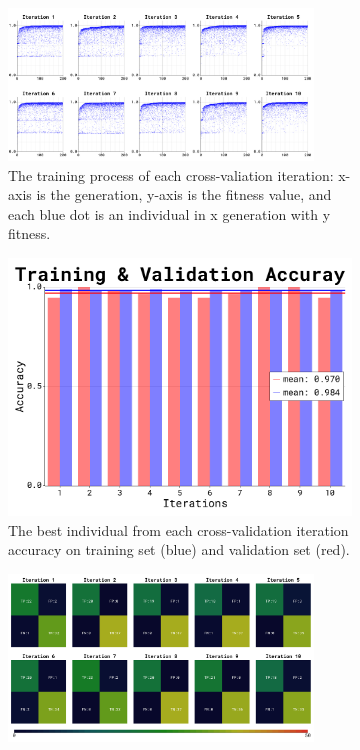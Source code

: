 \documentclass{article}
\begin{document}
\begin{figure}[ht]
    \begin{subfigure}{\textwidth}  
        \centering
        \includegraphics[width=0.89\textwidth]{wdbc-30-15-1/train_proc}
        \caption{The training process of each cross-valiation iteration: x-axis is the generation, y-axis is the fitness value, and each blue dot is an individual in x generation with y fitness.}
        \label{fig:2a}
    \end{subfigure}
    \begin{subfigure}{\textwidth}  
        \centering
        \includegraphics[scale=0.25]{wdbc-30-15-1/accuracy}
        \caption{The best individual from each cross-validation iteration accuracy on training set (blue) and validation set (red).}
        \label{fig:2b}
    \end{subfigure}
    \begin{subfigure}{\textwidth}   
        \centering
        \includegraphics[width=0.89\textwidth]{wdbc-30-15-1/conf_mat}

\end{subfigure}
\end{figure}
\end{document}
